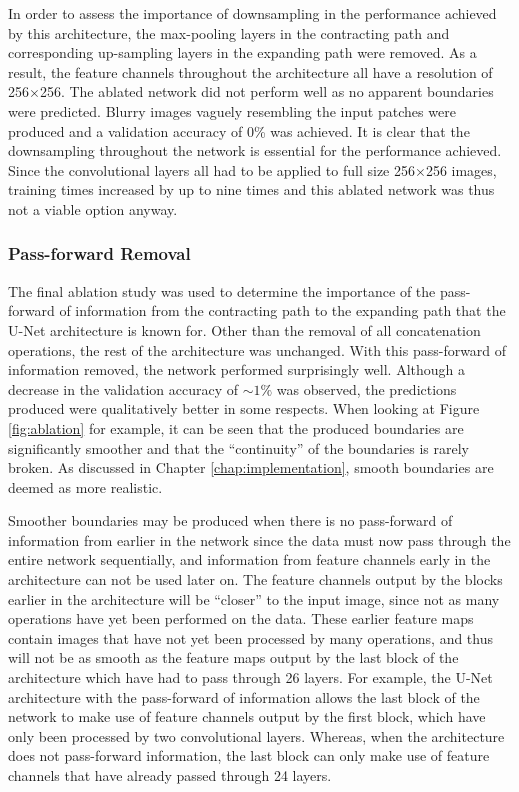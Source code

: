 In order to assess the importance of downsampling in the performance achieved by this architecture, the max-pooling layers in the contracting path and corresponding up-sampling layers in the expanding path were removed. As a result, the feature channels throughout the architecture all have a resolution of 256$\times$256. The ablated network did not perform well as no apparent boundaries were predicted. Blurry images vaguely resembling the input patches were produced and a validation accuracy of 0\% was achieved. It is clear that the downsampling throughout the network is essential for the performance achieved. Since the convolutional layers all had to be applied to full size 256$\times$256 images, training times increased by up to nine times and this ablated network was thus not a viable option anyway.

\subsubsection{Pass-forward Removal}

The final ablation study was used to determine the importance of the pass-forward of information from the contracting path to the expanding path that the U-Net architecture is known for. Other than the removal of all concatenation operations, the rest of the architecture was unchanged. With this pass-forward of information removed, the network performed surprisingly well. Although a decrease in the validation accuracy of ${\sim}1\%$ was observed, the predictions produced were qualitatively better in some respects. When looking at Figure \ref{fig:ablation} for example, it can be seen that the produced boundaries are significantly smoother and that the ``continuity'' of the boundaries is rarely broken. As discussed in Chapter \ref{chap:implementation}, smooth boundaries are deemed as more realistic.

Smoother boundaries may be produced when there is no pass-forward of information from earlier in the network since the data must now pass through the entire network sequentially, and information from feature channels early in the architecture can not be used later on. The feature channels output by the blocks earlier in the architecture will be ``closer'' to the input image, since not as many operations have yet been performed on the data. These earlier feature maps contain images that have not yet been processed by many operations, and thus will not be as smooth as the feature maps output by the last block of the architecture which have had to pass through 26 layers. For example, the U-Net architecture with the pass-forward of information allows the last block of the network to make use of feature channels output by the first block, which have only been processed by two convolutional layers. Whereas, when the architecture does not pass-forward information, the last block can only make use of feature channels that have already passed through 24 layers.


